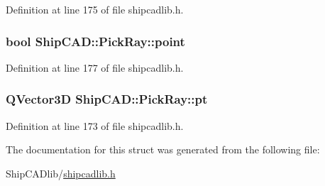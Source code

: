 Definition at line 175 of file shipcadlib.\+h.

\subsubsection[{\texorpdfstring{point}{point}}]{\setlength{\rightskip}{0pt plus 5cm}bool Ship\+C\+A\+D\+::\+Pick\+Ray\+::point}\hypertarget{structShipCAD_1_1PickRay_a6576863fe4c5cb5eaa5ebcaa474104c8}{}\label{structShipCAD_1_1PickRay_a6576863fe4c5cb5eaa5ebcaa474104c8}


Definition at line 177 of file shipcadlib.\+h.

\subsubsection[{\texorpdfstring{pt}{pt}}]{\setlength{\rightskip}{0pt plus 5cm}Q\+Vector3D Ship\+C\+A\+D\+::\+Pick\+Ray\+::pt}\hypertarget{structShipCAD_1_1PickRay_a2a9ed44a643481ceefcdec276ce7425a}{}\label{structShipCAD_1_1PickRay_a2a9ed44a643481ceefcdec276ce7425a}


Definition at line 173 of file shipcadlib.\+h.



The documentation for this struct was generated from the following file\+:\begin{DoxyCompactItemize}
\item 
Ship\+C\+A\+Dlib/\hyperlink{shipcadlib_8h}{shipcadlib.\+h}\end{DoxyCompactItemize}
